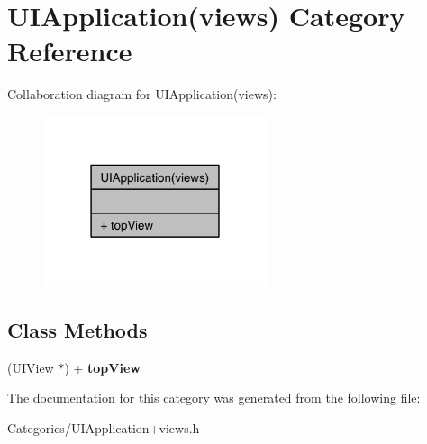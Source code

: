 \hypertarget{category_u_i_application_07views_08}{\section{U\-I\-Application(views) Category Reference}
\label{category_u_i_application_07views_08}
}


Collaboration diagram for U\-I\-Application(views)\-:
\nopagebreak
\begin{figure}[H]
\begin{center}
\leavevmode
\includegraphics[width=186pt]{category_u_i_application_07views_08__coll__graph}
\end{center}
\end{figure}
\subsection*{Class Methods}
\begin{DoxyCompactItemize}
\item 
\hypertarget{category_u_i_application_07views_08_a141b6fcc141323b5c4e2e9449bce2aa7}{(U\-I\-View $\ast$) + {\bfseries top\-View}}\label{category_u_i_application_07views_08_a141b6fcc141323b5c4e2e9449bce2aa7}

\end{DoxyCompactItemize}


The documentation for this category was generated from the following file\-:\begin{DoxyCompactItemize}
\item 
Categories/U\-I\-Application+views.\-h\end{DoxyCompactItemize}
